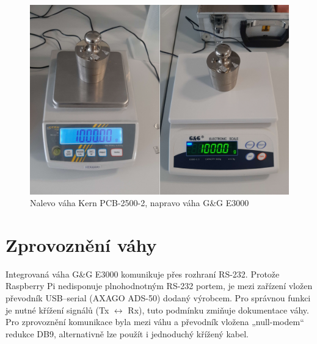 \begin{figure}[H]
    \begin{center}
        \includegraphics[scale=0.1]{obrazky/vahy.jpg}
    \end{center}
    \caption{Nalevo váha Kern PCB-2500-2, napravo váha G\&G E3000}
    \label{obr:váhy_porovnani}
\end{figure}

\section{Zprovoznění váhy}

Integrovaná váha G\&G E3000 komunikuje přes rozhraní RS-232. Protože Raspberry Pi nedisponuje plnohodnotným RS-232 portem, je mezi zařízení vložen převodník USB–serial (AXAGO ADS-50) dodaný výrobcem. Pro správnou funkci je nutné křížení signálů (Tx $\leftrightarrow$ Rx), tuto podmínku zmiňuje dokumentace váhy. Pro zprovoznění komunikace byla mezi váhu a převodník vložena „null-modem“ redukce DB9, alternativně lze použít i jednoduchý křížený kabel.






